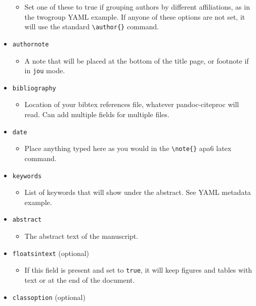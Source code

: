 \documentclass[,longtable]{apa6}
\let\tightlist\relax %
\begin{document}
\begin{itemize}
  \begin{itemize}
  \tightlist
  \item
    Set one of these to true if grouping authors by different
    affiliations, as in the twogroup YAML example. If anyone of these
    options are not set, it will use the standard
    \texttt{\textbackslash{}author\{\}} command.
  \end{itemize}
\item
  \texttt{authornote}

  \begin{itemize}
  \tightlist
  \item
    A note that will be placed at the bottom of the title page, or
    footnote if in \texttt{jou} mode.
  \end{itemize}
\item
  \texttt{bibliography}

  \begin{itemize}
  \tightlist
  \item
    Location of your bibtex references file, whatever pandoc-citeproc
    will read. Can add multiple fields for multiple files.
  \end{itemize}
\item
  \texttt{date}

  \begin{itemize}
  \tightlist
  \item
    Place anything typed here as you would in the
    \texttt{\textbackslash{}note\{\}} apa6 latex command.
  \end{itemize}
\item
  \texttt{keywords}

  \begin{itemize}
  \tightlist
  \item
    List of keywords that will show under the abstract. See YAML
    metadata example.
  \end{itemize}
\item
  \texttt{abstract}

  \begin{itemize}
  \tightlist
  \item
    The abstract text of the manuscript.
  \end{itemize}
\item
  \texttt{floatsintext} (optional)

  \begin{itemize}
  \tightlist
  \item
    If this field is present and set to \texttt{true}, it will keep
    figures and tables with text or at the end of the document.
  \end{itemize}
\item
  \texttt{classoption} (optional)


\end{itemize}
\end{document}
